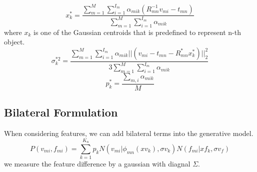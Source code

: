\begin{equation}
x_k^*=\frac{\sum_{m=1}^M\sum_{i=1}^{I_m}\alpha_{mik}(R_{mn}^{-1}v_{mi}-t_{mn})}{\sum_{m=1}^M\sum_{i=1}^{I_m}\alpha_{mik}}
\end{equation}
where $x_k$ is one of the Gaussian centroids that is predefined to represent n-th object. 
\begin{equation}
\sigma_k^{*2}=\frac{\sum_{m=1}^M\sum_{i=1}^{I_m}\alpha_{mik}||(v_{mi}-t_{mn}-R_{mn}^*x_k^*)||_2^2}{3\sum_{m=1}^M\sum_{i=1}^{I_m}\alpha_{mik}}
\end{equation}
\begin{equation}
p_k^*=\frac{\sum_{m,i}\alpha_{mik}}{M}
\end{equation}
\subsection{Bilateral Formulation}
When considering features, we can add bilateral terms into the generative model.
\begin{equation}
P(v_{mi},f_{mi})=\sum^{K_n}_{k=1}p_kN(v_{mi}|\phi_{mn}(xv_k),\sigma v_k)N(f_{mi}|xf_k,\sigma v_f)
\end{equation}
we measure the feature difference by a gaussian with diagnal $\Sigma$.

